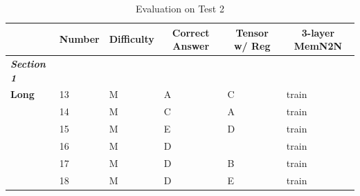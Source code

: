 \documentclass[pageno]{final_paper}
\newcommand{\textbi}[1]{\textbf{\textit{#1}}}
\begin{document}
\begin{table}[t]
\footnotesize
\centering
\caption{Evaluation on Test 2}
\label{tab: Evaluation on Test 2}
\begin{tabular}{llllll}
\toprule
\multicolumn{1}{c}{}     & \multicolumn{1}{c}{\textbf{Number}} & \multicolumn{1}{c}{\textbf{Difficulty}} & \multicolumn{1}{c}{\textbf{Correct Answer}} & \multicolumn{1}{c}{\textbf{Tensor w/ Reg}} & \multicolumn{1}{c}{\textbf{3-layer MemN2N}} \\ \midrule
\textbi{Section 1}       &                                     &                                         &                                             &                                            &                                             \\ \midrule
\textbf{Long}            & 13                                  & M                                       & A                                           & C                                          & train                                       \\
\textbf{}                & 14                                  & M                                       & C                                           & A                                          & train                                       \\
\textbf{}                & 15                                  & M                                       & E                                           & D                                          & train                                       \\
\textbf{}                & 16                                  & M                                       & D                                           & \g{D}                                      & train                                       \\
\textbf{}                & 17                                  & M                                       & D                                           & B                                          & train                                       \\
\textbf{}                & 18                                  & M                                       & D                                           & E                                          & train                                       \\

\end{tabular}
\end{table}
\end{document}
